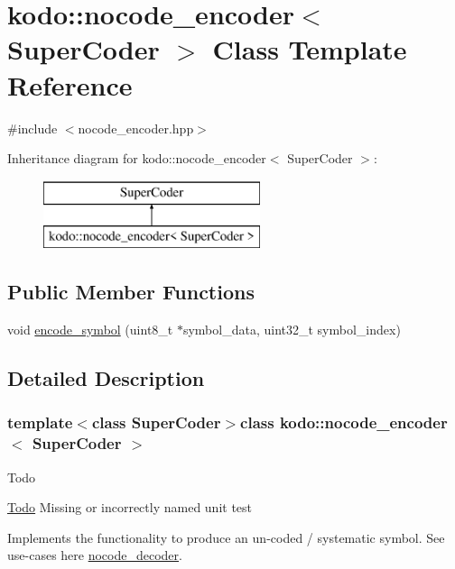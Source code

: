 \hypertarget{classkodo_1_1nocode__encoder}{\section{kodo\-:\-:nocode\-\_\-encoder$<$ Super\-Coder $>$ Class Template Reference}
\label{classkodo_1_1nocode__encoder}
}


{\ttfamily \#include $<$nocode\-\_\-encoder.\-hpp$>$}

Inheritance diagram for kodo\-:\-:nocode\-\_\-encoder$<$ Super\-Coder $>$\-:\begin{figure}[H]
\begin{center}
\leavevmode
\includegraphics[height=2.000000cm]{classkodo_1_1nocode__encoder}
\end{center}
\end{figure}
\subsection*{Public Member Functions}
\begin{DoxyCompactItemize}
\item 
void \hyperlink{classkodo_1_1nocode__encoder_a6adbf70fc913efbe4801d791adfba41a}{encode\-\_\-symbol} (uint8\-\_\-t $\ast$symbol\-\_\-data, uint32\-\_\-t symbol\-\_\-index)
\begin{DoxyCompactList}\small\item\em \end{DoxyCompactList}\end{DoxyCompactItemize}


\subsection{Detailed Description}
\subsubsection*{template$<$class Super\-Coder$>$class kodo\-::nocode\-\_\-encoder$<$ Super\-Coder $>$}

\begin{DoxyRefDesc}{Todo}
\item[\hyperlink{todo__todo000028}{Todo}]Missing or incorrectly named unit test

Implements the functionality to produce an un-\/coded / systematic symbol. See use-\/cases here \hyperlink{classkodo_1_1nocode__decoder}{nocode\-\_\-decoder}. \end{DoxyRefDesc}



